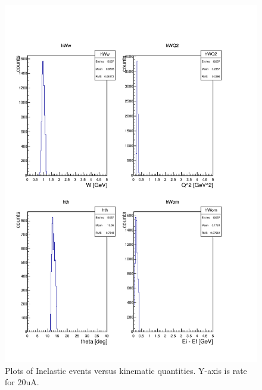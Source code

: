 \documentclass[]{article}
\begin{document}
\begin{figure}	
	\begin{center}
		\includegraphics[width=0.98\columnwidth]{shms_pointtarg_13p5deg_2gev_wc_mscat_vac_sieve_car44_kin.pdf}
	\end{center}
	\caption{Plots of Inelastic events versus kinematic quantities. Y-axis is rate for 20uA. }
	\label{fig:kin}
\end{figure}
\end{document}
